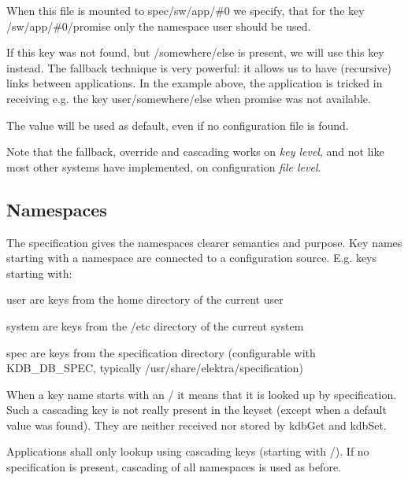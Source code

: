 \begin{DoxyEnumerate}
\item When this file is mounted to {\ttfamily spec/sw/app/\#0} we specify, that for the key {\ttfamily /sw/app/\#0/promise} only the namespace {\ttfamily user} should be used.
\item If this key was not found, but {\ttfamily /somewhere/else} is present, we will use this key instead. The {\ttfamily fallback} technique is very powerful\+: it allows us to have (recursive) links between applications. In the example above, the application is tricked in receiving e.\+g. the key {\ttfamily user/somewhere/else} when {\ttfamily promise} was not available.
\item The value {} will be used as default, even if no configuration file is found.
\end{DoxyEnumerate}

Note that the fallback, override and cascading works on {\itshape key level}, and not like most other systems have implemented, on configuration {\itshape file level}.

\subsection*{Namespaces}

The specification gives the namespaces clearer semantics and purpose. Key names starting with a namespace are connected to a configuration source. E.\+g. keys starting with\+:


\begin{DoxyItemize}
\item {\ttfamily user} are keys from the home directory of the current user
\item {\ttfamily system} are keys from the {\ttfamily /etc} directory of the current system
\item {\ttfamily spec} are keys from the specification directory (configurable with {\ttfamily K\+D\+B\+\_\+\+D\+B\+\_\+\+S\+P\+EC}, typically {\ttfamily /usr/share/elektra/specification})
\end{DoxyItemize}

When a key name starts with an {\ttfamily /} it means that it is looked up by specification. Such a cascading key is not really present in the keyset (except when a default value was found). They are neither received nor stored by {\ttfamily kdb\+Get} and {\ttfamily kdb\+Set}.

Applications shall only lookup using cascading keys (starting with {\ttfamily /}). If no specification is present, cascading of all namespaces is used as before.

